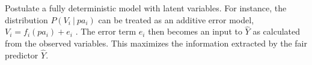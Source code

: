  Postulate a fully deterministic model with
latent variables. For instance, the distribution $P(V_i\ |\ pa_i)$
can be treated as an additive error model, $V_i
\!=\! f_i(pa_i) \!+\! e_i$ \citep{peters:14}. The
error term $e_i$ then becomes an input to $\hat Y$ as calculated from
the observed variables. This maximizes the information extracted by
the fair predictor $\hat Y$.


